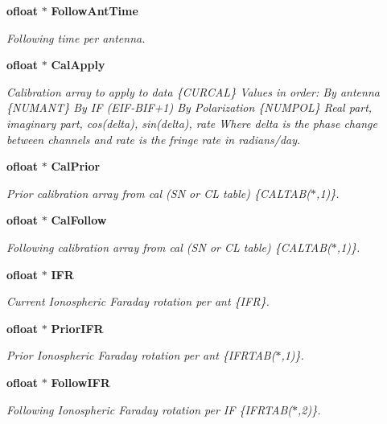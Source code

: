 \begin{CompactItemize}
{\bf ofloat} $\ast$ {\bf Follow\-Ant\-Time}
\begin{CompactList}\small\item\em Following time per antenna. \item\end{CompactList}\item 
{\bf ofloat} $\ast$ {\bf Cal\-Apply}
\begin{CompactList}\small\item\em Calibration array to apply to data \{CURCAL\} Values in order: By antenna \{NUMANT\} By IF (EIF-BIF+1) By Polarization \{NUMPOL\} Real part, imaginary part, cos(delta), sin(delta), rate Where delta is the phase change between channels and rate is the fringe rate in radians/day. \item\end{CompactList}\item 
{\bf ofloat} $\ast$ {\bf Cal\-Prior}
\begin{CompactList}\small\item\em Prior calibration array from cal (SN or CL table) \{CALTAB($\ast$,1)\}. \item\end{CompactList}\item 
{\bf ofloat} $\ast$ {\bf Cal\-Follow}
\begin{CompactList}\small\item\em Following calibration array from cal (SN or CL table) \{CALTAB($\ast$,1)\}. \item\end{CompactList}\item 
{\bf ofloat} $\ast$ {\bf IFR}
\begin{CompactList}\small\item\em Current Ionospheric Faraday rotation per ant \{IFR\}. \item\end{CompactList}\item 
{\bf ofloat} $\ast$ {\bf Prior\-IFR}
\begin{CompactList}\small\item\em Prior Ionospheric Faraday rotation per ant \{IFRTAB($\ast$,1)\}. \item\end{CompactList}\item 
{\bf ofloat} $\ast$ {\bf Follow\-IFR}
\begin{CompactList}\small\item\em Following Ionospheric Faraday rotation per IF \{IFRTAB($\ast$,2)\}. \item\end{CompactList}\item 

\end{CompactItemize}
